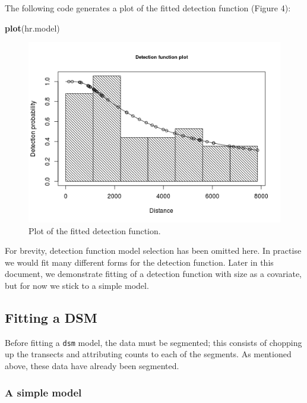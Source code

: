 \documentclass[]{article}
\newenvironment{Shaded}{}{}
\newcommand{\KeywordTok}[1]{\textcolor[rgb]{0.00,0.44,0.13}{\textbf{{#1}}}}
\newcommand{\NormalTok}[1]{{#1}}
\begin{document}
The following code generates a plot of the fitted detection function
(Figure 4):

\begin{Shaded}
\begin{Highlighting}[]
\KeywordTok{plot}\NormalTok{(hr.model)}
\end{Highlighting}
\end{Shaded}

\begin{figure}[htbp]
\centering
\includegraphics{mexico-figs/hr-detfct.png}
\caption{Plot of the fitted detection function.}
\end{figure}

For brevity, detection function model selection has been omitted here.
In practise we would fit many different forms for the detection
function. Later in this document, we demonstrate fitting of a detection
function with size as a covariate, but for now we stick to a simple
model.

\subsection{Fitting a DSM}\label{fitting-a-dsm}

Before fitting a \texttt{dsm} model, the data must be segmented; this
consists of chopping up the transects and attributing counts to each of
the segments. As mentioned above, these data have already been
segmented.

\subsubsection{A simple model}\label{a-simple-model}
\end{document}
